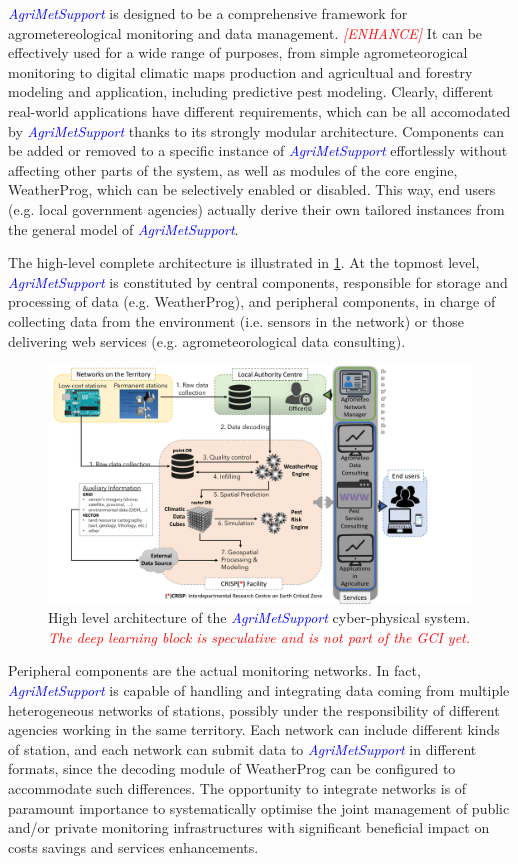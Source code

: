 \documentclass[authoryear,preprint,review,12pt]{elsarticle}
\newcommand{\note}[1]{\emph{\textcolor{red}{#1}}}
\newcommand{\update}[1]{\emph{\textcolor{blue}{#1}}}
\newcommand{\gci}{\update{AgriMetSupport}\xspace}
\begin{document}
\gci is designed to be a comprehensive framework for agrometereological monitoring and data management.
\note{[ENHANCE]} It can be effectively used for a wide range of purposes, from simple agrometeorogical monitoring to digital climatic maps production and agricultual and forestry modeling and application, including predictive pest modeling.
Clearly, different real-world applications have different requirements, which can be all accomodated by \gci thanks to its strongly modular architecture.
Components can be added or removed to a specific instance of \gci effortlessly without affecting other parts of the system, as well as modules of the core engine, WeatherProg, which can be selectively enabled or disabled.
This way, end users (e.g. local government agencies) actually derive their own tailored instances from the general model of \gci.

The high-level complete architecture is illustrated in \cref{cyberPhysicalSystemFig}.
At the topmost level, \gci is constituted by central components, responsible for storage and processing of data (e.g. WeatherProg), and peripheral components, in charge of collecting data from the environment (i.e. sensors in the network) or those delivering web services (e.g. agrometeorological data consulting).

\begin{figure}
	\centering
	\includegraphics[scale=.5]{figures/AgriMetSupport-fig.pdf}
	\caption{High level architecture of the \gci cyber-physical system. \note{The deep learning block is speculative and is not part of the GCI yet.}}
	\label{cyberPhysicalSystemFig}
\end{figure}

Peripheral components are the actual monitoring networks.
In fact, \gci is capable of handling and integrating data coming from multiple heterogeneous networks of stations, possibly under the responsibility of different agencies working in the same territory.
Each network can include different kinds of station, and each network can submit data to \gci in different formats, since the decoding module of WeatherProg can be configured to accommodate such differences.
The opportunity to integrate networks is of paramount importance to systematically optimise the joint management of public and/or private monitoring infrastructures with significant beneficial impact on costs savings and services enhancements.
\end{document}
